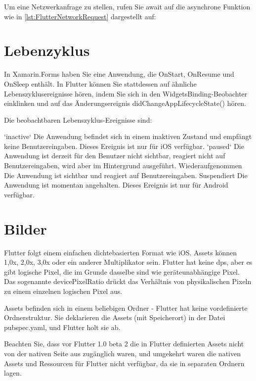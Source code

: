 Um eine Netzwerkanfrage zu stellen, rufen Sie await auf die asynchrone Funktion wie in \ref{lst:FlutterNetworkRequest} dargestellt auf:


\begin{minipage}{\linewidth}

\end{minipage}

\section{Lebenzyklus}
In Xamarin.Forms haben Sie eine Anwendung, die OnStart, OnResume und OnSleep enthält. In Flutter können Sie stattdessen auf ähnliche Lebenszyklusereignisse hören, indem Sie sich in den WidgetsBinding-Beobachter einklinken und auf das Änderungsereignis didChangeAppLifecycleState() hören.

Die beobachtbaren Lebenszyklus-Ereignisse sind:

`inactive`
Die Anwendung befindet sich in einem inaktiven Zustand und empfängt keine Benutzereingaben. Dieses Ereignis ist nur für iOS verfügbar.
`paused`
Die Anwendung ist derzeit für den Benutzer nicht sichtbar, reagiert nicht auf Benutzereingaben, wird aber im Hintergrund ausgeführt.
Wiederaufgenommen
Die Anwendung ist sichtbar und reagiert auf Benutzereingaben.
Suspendiert
Die Anwendung ist momentan angehalten. Dieses Ereignis ist nur für Android verfügbar.
\section{Bilder}
Flutter folgt einem einfachen dichtebasierten Format wie iOS. Assets können 1,0x, 2,0x, 3,0x oder ein anderer Multiplikator sein. Flutter hat keine dps, aber es gibt logische Pixel, die im Grunde dasselbe sind wie geräteunabhängige Pixel. Das sogenannte devicePixelRatio drückt das Verhältnis von physikalischen Pixeln zu einem einzelnen logischen Pixel aus.

Assets befinden sich in einem beliebigen Ordner - Flutter hat keine vordefinierte Ordnerstruktur. Sie deklarieren die Assets (mit Speicherort) in der Datei pubspec.yaml, und Flutter holt sie ab.

Beachten Sie, dass vor Flutter 1.0 beta 2 die in Flutter definierten Assets nicht von der nativen Seite aus zugänglich waren, und umgekehrt waren die nativen Assets und Ressourcen für Flutter nicht verfügbar, da sie in separaten Ordnern lagen.

